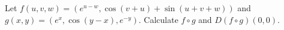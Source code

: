 \documentclass[openany]{book}
\begin{document}
\begin{prob}[2.5, Q8]
    Let \( f(u, v, w) = (e^{u-w}, \cos (v + u) + \sin (u + v + w)) \) and \( g(x, y) = (e^x, \cos (y - x), e^{-y}). \)  
   Calculate \( f \circ g \) and \( D(f \circ g)(0, 0)\).
\end{prob}
\end{document}
